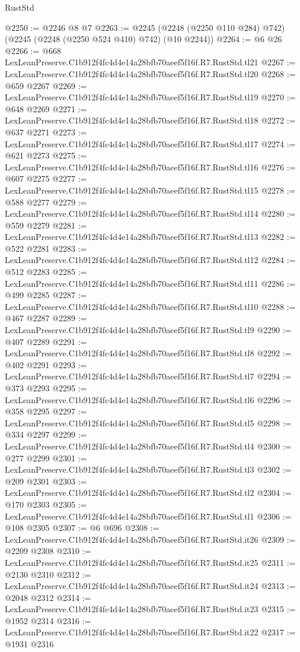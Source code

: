 \begin{lexlean}{RustStd}
\begin{coremodule}
@2250 := @2246 @8 @7
@2263 := @2245 (@2248 (@2250 @110 @284) @742) (@2245 (@2248 (@2250 @524 @410) @742) (@10 @2244))
@2264 := @6 @26
@2266 := @668 LexLeanPreserve.C1b912f4fc4d4e14a28bfb70aeef5f16f.R7.RustStd.tl21
@2267 := LexLeanPreserve.C1b912f4fc4d4e14a28bfb70aeef5f16f.R7.RustStd.tl20
@2268 := @659 @2267
@2269 := LexLeanPreserve.C1b912f4fc4d4e14a28bfb70aeef5f16f.R7.RustStd.tl19
@2270 := @648 @2269
@2271 := LexLeanPreserve.C1b912f4fc4d4e14a28bfb70aeef5f16f.R7.RustStd.tl18
@2272 := @637 @2271
@2273 := LexLeanPreserve.C1b912f4fc4d4e14a28bfb70aeef5f16f.R7.RustStd.tl17
@2274 := @621 @2273
@2275 := LexLeanPreserve.C1b912f4fc4d4e14a28bfb70aeef5f16f.R7.RustStd.tl16
@2276 := @607 @2275
@2277 := LexLeanPreserve.C1b912f4fc4d4e14a28bfb70aeef5f16f.R7.RustStd.tl15
@2278 := @588 @2277
@2279 := LexLeanPreserve.C1b912f4fc4d4e14a28bfb70aeef5f16f.R7.RustStd.tl14
@2280 := @559 @2279
@2281 := LexLeanPreserve.C1b912f4fc4d4e14a28bfb70aeef5f16f.R7.RustStd.tl13
@2282 := @522 @2281
@2283 := LexLeanPreserve.C1b912f4fc4d4e14a28bfb70aeef5f16f.R7.RustStd.tl12
@2284 := @512 @2283
@2285 := LexLeanPreserve.C1b912f4fc4d4e14a28bfb70aeef5f16f.R7.RustStd.tl11
@2286 := @499 @2285
@2287 := LexLeanPreserve.C1b912f4fc4d4e14a28bfb70aeef5f16f.R7.RustStd.tl10
@2288 := @467 @2287
@2289 := LexLeanPreserve.C1b912f4fc4d4e14a28bfb70aeef5f16f.R7.RustStd.tl9
@2290 := @407 @2289
@2291 := LexLeanPreserve.C1b912f4fc4d4e14a28bfb70aeef5f16f.R7.RustStd.tl8
@2292 := @402 @2291
@2293 := LexLeanPreserve.C1b912f4fc4d4e14a28bfb70aeef5f16f.R7.RustStd.tl7
@2294 := @373 @2293
@2295 := LexLeanPreserve.C1b912f4fc4d4e14a28bfb70aeef5f16f.R7.RustStd.tl6
@2296 := @358 @2295
@2297 := LexLeanPreserve.C1b912f4fc4d4e14a28bfb70aeef5f16f.R7.RustStd.tl5
@2298 := @334 @2297
@2299 := LexLeanPreserve.C1b912f4fc4d4e14a28bfb70aeef5f16f.R7.RustStd.tl4
@2300 := @277 @2299
@2301 := LexLeanPreserve.C1b912f4fc4d4e14a28bfb70aeef5f16f.R7.RustStd.tl3
@2302 := @209 @2301
@2303 := LexLeanPreserve.C1b912f4fc4d4e14a28bfb70aeef5f16f.R7.RustStd.tl2
@2304 := @170 @2303
@2305 := LexLeanPreserve.C1b912f4fc4d4e14a28bfb70aeef5f16f.R7.RustStd.tl1
@2306 := @108 @2305
@2307 := @6 @696
@2308 := LexLeanPreserve.C1b912f4fc4d4e14a28bfb70aeef5f16f.R7.RustStd.it26
@2309 := @2209 @2308
@2310 := LexLeanPreserve.C1b912f4fc4d4e14a28bfb70aeef5f16f.R7.RustStd.it25
@2311 := @2130 @2310
@2312 := LexLeanPreserve.C1b912f4fc4d4e14a28bfb70aeef5f16f.R7.RustStd.it24
@2313 := @2048 @2312
@2314 := LexLeanPreserve.C1b912f4fc4d4e14a28bfb70aeef5f16f.R7.RustStd.it23
@2315 := @1952 @2314
@2316 := LexLeanPreserve.C1b912f4fc4d4e14a28bfb70aeef5f16f.R7.RustStd.it22
@2317 := @1931 @2316

\end{coremodule}
\end{lexlean}
